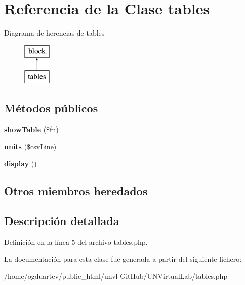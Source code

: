 \hypertarget{classtables}{}\section{Referencia de la Clase tables}
\label{classtables}
Diagrama de herencias de tables\begin{figure}[H]
\begin{center}
\leavevmode
\includegraphics[height=2.000000cm]{classtables}
\end{center}
\end{figure}
\subsection*{Métodos públicos}
\begin{DoxyCompactItemize}
\item 
\mbox{\label{classtables_abcd4e7cd574507fbd1fec1877a9cd72c}} 
{\bfseries show\+Table} (\$fn)
\item 
\mbox{\label{classtables_a7c9452dea1c737d4024d7560382f5f94}} 
{\bfseries units} (\$csv\+Line)
\item 
\mbox{\label{classtables_a464fe5c5777973672ef774bdc1e95a43}} 
{\bfseries display} ()
\end{DoxyCompactItemize}
\subsection*{Otros miembros heredados}


\subsection{Descripción detallada}


Definición en la línea 5 del archivo tables.\+php.



La documentación para esta clase fue generada a partir del siguiente fichero\+:\begin{DoxyCompactItemize}
\item 
/home/ogduartev/public\+\_\+html/unvl-\/\+Git\+Hub/\+U\+N\+Virtual\+Lab/tables.\+php\end{DoxyCompactItemize}
